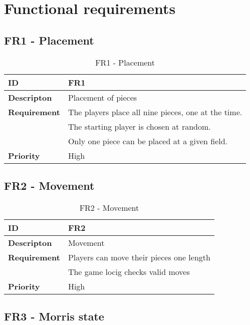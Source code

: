 \section{Functional requirements}

\subsection{FR1 - Placement}

\begin{table}[h!]
\begin{tabular}{ | p{90pt} | p{270pt}  |}
\hline
\bf ID &  FR1  \\ \hline
\bf Descripton & Placement of pieces \\ \hline 
\bf Requirement & The players place all nine pieces, one at the time.  \\   
& The starting player is chosen at random. \\ 
& Only one piece can be placed at a given field. \\ \hline
\bf Priority & High \\ \hline

\end{tabular}
\caption{FR1 - Placement}
\end{table}

\subsection{FR2 - Movement}

\begin{table}[h!]
\begin{tabular}{ | p{90pt} | p{270pt}  |}
\hline
\bf ID &  FR2  \\ \hline
\bf Descripton & Movement \\ \hline 
\bf Requirement & Players can move their pieces one length  \\
& The game locig checks valid moves  \\ \hline
\bf Priority & High \\ \hline

\end{tabular}
\caption{FR2 - Movement}
\end{table}

\subsection{FR3 - Morris state}

